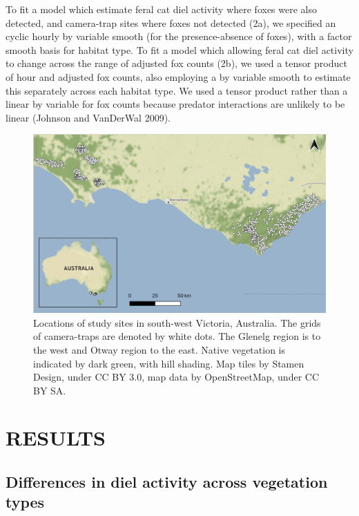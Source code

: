 \documentclass[]{elsarticle} %
\begin{document}
To fit a model which estimate feral cat diel activity where foxes were also detected, and camera-trap sites where foxes not detected (2a), we specified an cyclic hourly by variable smooth (for the presence-absence of foxes), with a factor smooth basis for habitat type. To fit a model which allowing feral cat diel activity to change across the range of adjusted fox counts (2b), we used a tensor product of hour and adjusted fox counts, also employing a by variable smooth to estimate this separately across each habitat type. We used a tensor product rather than a linear by variable for fox counts because predator interactions are unlikely to be linear (Johnson and VanDerWal 2009).

\newpage

\begin{figure}
\includegraphics[width=1\linewidth]{../figs/fig1_map} \caption{Locations of study sites in south-west Victoria, Australia. The grids of camera-traps are denoted by white dots. The Glenelg region is to the west and Otway region to the east. Native vegetation is indicated by dark green, with hill shading. Map tiles by Stamen Design, under CC BY 3.0, map data by OpenStreetMap, under CC BY SA.}\label{fig:map}
\end{figure}

\newpage

\hypertarget{results}{%
\section{RESULTS}\label{results}}

\hypertarget{differences-in-diel-activity-across-vegetation-types}{%
\subsection{Differences in diel activity across vegetation types}\label{differences-in-diel-activity-across-vegetation-types}}
\end{document}
